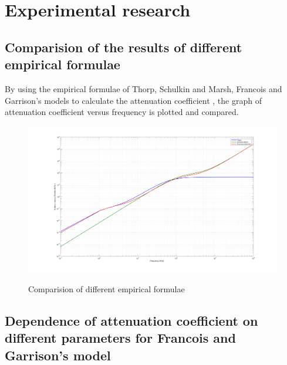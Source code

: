 \chapter{Experimental research} \label{Experimental research}

\section{ Comparision of the results of different empirical formulae } \label{Comparision of the results of different empirical formulae}
\noindent By using the empirical formulae of Thorp, Schulkin and Marsh, Francois and Garrison's models to calculate the attenuation coefficient , the graph of attenuation coefficient versus frequency is plotted and compared.

\begin{figure}[H]
\centering
{\includegraphics[scale=0.15]{ucp2_1.png}}
\caption{Comparision of different empirical formulae}
\end{figure}

\section{Dependence of attenuation coefficient on different parameters for Francois and Garrison's model} \label{Dependence of attenuation coefficient on different parameters for Francois and Garrison's model} 
